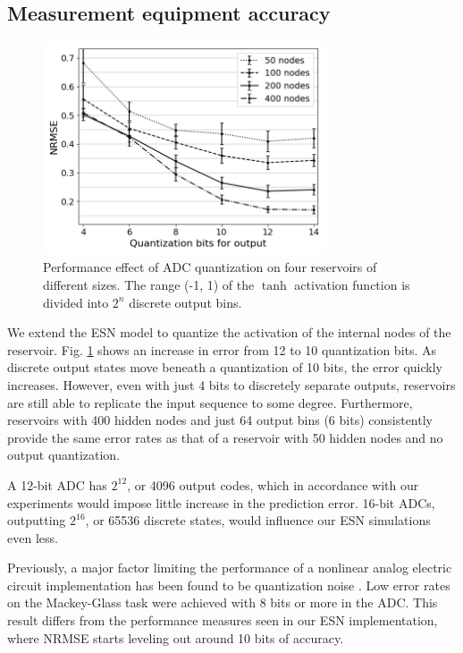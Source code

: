 \subsection{Measurement equipment accuracy}

\begin{figure}[t!]
  \centering
  \includegraphics[width=3.3in]{img/adc_quantization.png}
  \caption{
    Performance effect of ADC quantization on four reservoirs of different
sizes. The range (-1, 1) of the $\tanh$ activation function is divided into
$2^n$ discrete output bins.
  }
  \label{adc_quantization}
\end{figure}

We extend the ESN model to quantize the activation of the internal nodes of the
reservoir. Fig. \ref{adc_quantization} shows an increase in error from 12 to 10
quantization bits. As discrete output states move beneath a quantization of 10
bits, the error quickly increases. However, even with just 4 bits to discretely
separate outputs, reservoirs are still able to replicate the input sequence to
some degree. Furthermore, reservoirs with 400 hidden nodes and just 64 output
bins (6 bits) consistently provide the same error rates as that of a reservoir
with 50 hidden nodes and no output quantization.

A 12-bit ADC has $2^{12}$, or 4096 output codes, which in accordance with our
experiments would impose little increase in the prediction error. 16-bit ADCs,
outputting $2^{16}$, or 65536 discrete states, would influence our ESN
simulations even less.

Previously, a major factor limiting the performance of a nonlinear analog
electric circuit implementation has been found to be quantization noise
\cite{soriano_delay-based_2015}. Low error rates on the Mackey-Glass task were
achieved with 8 bits or more in the ADC. This result differs from the
performance measures seen in our ESN implementation, where NRMSE starts leveling
out around 10 bits of accuracy.

